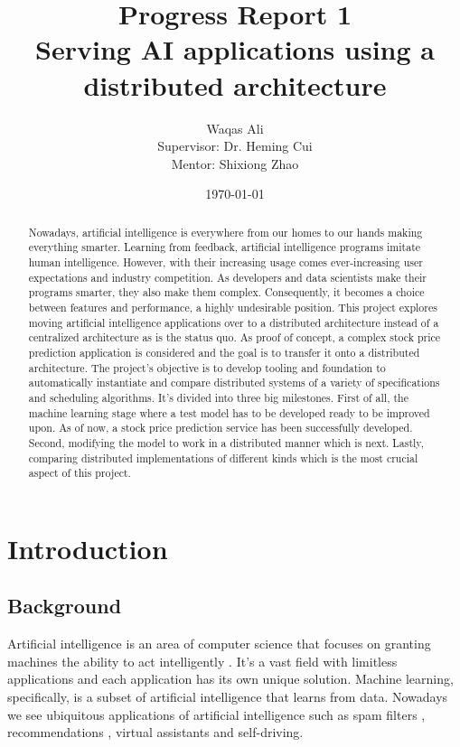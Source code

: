 \documentclass{report}
\title{Progress Report 1 \\ Serving AI applications using a distributed architecture}
\author{Waqas Ali\\{\small Supervisor: Dr. Heming Cui}\\{\small Mentor: Shixiong Zhao}}
\date{\today}
\def\frontmatter{%
    \pagenumbering{roman}
    \setcounter{page}{1}
    \renewcommand{\thesection}{\Roman{section}}
}%
\def\mainmatter{%
    \pagenumbering{arabic}
    \setcounter{page}{1}
    \setcounter{section}{0}
    \renewcommand{\thesection}{\thechapter.\arabic{section}}
}%
\begin{document}
\maketitle

\frontmatter

\begin{abstract}
\thispagestyle{plain}
Nowadays, artificial intelligence is everywhere from our homes to our hands making everything smarter. Learning from feedback, artificial intelligence programs imitate human intelligence. However, with their increasing usage comes ever-increasing user expectations and industry competition. As developers and data scientists make their programs smarter, they also make them complex. Consequently, it becomes a choice between features and performance, a highly undesirable position. This project explores moving artificial intelligence applications over to a distributed architecture instead of a centralized architecture as is the status quo. As proof of concept, a complex stock price prediction application is considered and the goal is to transfer it onto a distributed architecture. The project's objective is to develop tooling and foundation to automatically instantiate and compare distributed systems of a variety of specifications and scheduling algorithms. It's divided into three big milestones. First of all, the machine learning stage where a test model has to be developed ready to be improved upon. As of now, a stock price prediction service has been successfully developed. Second, modifying the model to work in a distributed manner which is next. Lastly, comparing distributed implementations of different kinds which is the most crucial aspect of this project.
\end{abstract}

\setcounter{page}{2}
\tableofcontents

\newpage
{}
\listoffigures

\newpage
{}
\listoftables

\newpage
\mainmatter

\chapter{Introduction}

\section{Background}
Artificial intelligence is an area of computer science that focuses on granting machines the ability to act intelligently \cite{McCarthy2007}. It's a vast field with limitless applications and each application has its own unique solution. Machine learning, specifically, is a subset of artificial intelligence that learns from data. \cite{Mitchell1997} Nowadays we see ubiquitous applications of artificial intelligence such as spam filters \cite{Androutsopoulos2000},  recommendations \cite{lekakos2008hybrid}, virtual assistants and self-driving.
\end{document}
